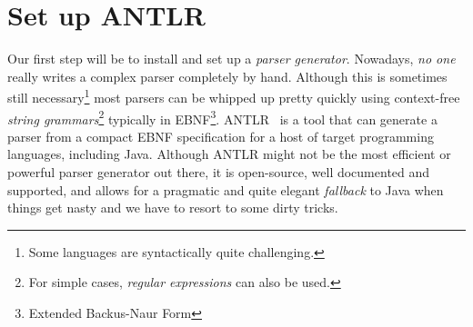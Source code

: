 \section{Set up ANTLR}
 
Our first step will be to install and set up a \emph{parser generator}.
Nowadays, \emph{no one} really writes a complex parser completely by hand.
Although this is sometimes still necessary\footnote{Some languages are syntactically quite challenging.} most parsers can be whipped up pretty quickly using context-free \emph{string grammars}\footnote{For simple cases, \emph{regular expressions} can also be used.} typically in EBNF\footnote{Extended Backus-Naur Form}.
ANTLR~\cite{ANTLR} is a tool that can generate a parser from a compact EBNF specification for a host of target programming languages, including Java.
Although ANTLR might not be the most efficient or powerful parser generator out there, it is open-source, well documented and supported, and allows for a pragmatic and quite elegant \emph{fallback} to Java when things get nasty and we have to resort to some dirty tricks.

